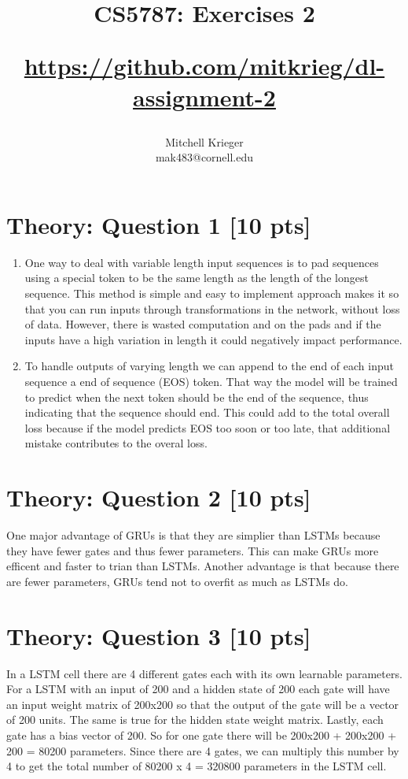 \documentclass{article}
\title{CS5787: Exercises 2 \\ \begin{small}\url{https://github.com/mitkrieg/dl-assignment-2}\end{small}}
\author{Mitchell Krieger \\ mak483@cornell.edu}
\date{}
\begin{document}
\maketitle

\section{Theory: Question 1 [10 pts]}

\begin{enumerate}[label=\alph*)]
    \item One way to deal with variable length input sequences is to pad sequences using a special token to be the same length as the length of the longest sequence. This method is simple and easy to implement approach makes it so that you can run inputs through transformations in the network, without loss of data. However, there is wasted computation and on the pads and if the inputs have a high variation in length it could negatively impact performance.
    \item To handle outputs of varying length we can append to the end of each input sequence a end of sequence (EOS) token. That way the model will be trained to predict when the next token should be the end of the sequence, thus indicating that the sequence should end. This could add to the total overall loss because if the model predicts EOS too soon or too late, that additional mistake contributes to the overal loss. 
\end{enumerate}

\section{Theory: Question 2 [10 pts]}

One major advantage of GRUs is that they are simplier than LSTMs because they have fewer gates and thus fewer parameters. This can make GRUs more efficent and faster to trian than LSTMs. Another advantage is that because there are fewer parameters, GRUs tend not to overfit as much as LSTMs do. 

\section{Theory: Question 3 [10 pts]}

In a LSTM cell there are 4 different gates each with its own learnable parameters. For a LSTM with an input of 200 and a hidden state of 200 each gate will have an input weight matrix of 200x200 so that the output of the gate will be a vector of 200 units. The same is true for the hidden state weight matrix. Lastly, each gate has a bias vector of 200. So for one gate there will be 200x200 + 200x200 + 200 = 80200 parameters. Since there are 4 gates, we can multiply this number by 4 to get the total number of 80200 x 4 = 320800 parameters in the LSTM cell.
\end{document}
